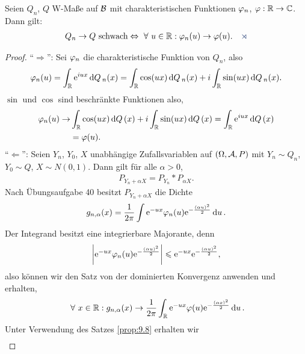 \begin{prop}
\label{prop:9.10}
Seien $Q_{n}$, $Q$ W-Maße auf ${\BB}$ mit
charakteristischen Funktionen $\ph_{n}$, $\ph :\R\to \C$.
Dann gilt:
\begin{align*}
Q_{n}\to Q \text{ schwach} \Leftrightarrow \forall u\in
\R : \ph_{n} (u) \to \ph (u).\fishhere
\end{align*}
\end{prop}
\begin{proof}
``$\Rightarrow$'': Sei $\ph_n$ die charakteristische Funktion von $Q_n$, also
\begin{align*}
\ph_n(u) = \int_\R \e^{iux}\dQ_n(x)
= \int_\R \cos(ux)\dQ_n(x) + i\int_\R \sin(ux)\dQ_n(x).
\end{align*}
$\sin$ und $\cos$ sind beschränkte Funktionen also,
\begin{align*}
\ph_n(u)
\to &\int_\R \cos(ux)\dQ(x) + i\int_\R \sin(ux)\dQ(x)
= \int_\R \e^{iux}\dQ(x) \\ &= \ph(u).
\end{align*}
``$\Leftarrow$'': Seien $Y_n$, $Y_0$, $X$ unabhängige Zufallsvariablen auf
$(\Omega,\AA,P)$ mit $Y_n\sim Q_n$, $Y_0\sim Q$, $X\sim N(0,1)$. Dann gilt für
alle $\alpha>0$,
\begin{align*}
P_{Y_n+\alpha X} = P_{Y_n}*P_{\alpha X}.
\end{align*}
Nach Übungsaufgabe 40 besitzt $P_{Y_n+\alpha X}$ die Dichte
\begin{align*}
g_{n,\alpha}(x) = \frac{1}{2\pi}\int \e^{-ux}\ph_n(u)\e^{-\frac{(\alpha
u)^2}{2}}\du.
\end{align*}
Der Integrand besitzt eine integrierbare Majorante, denn
\begin{align*}
\abs{\e^{-ux}\ph_n(u)\e^{-\frac{(\alpha
u)^2}{2}}}
\le
\e^{-ux}\e^{-\frac{(\alpha u)^2}{2}},
\end{align*}
also können wir den Satz von der dominierten Konvergenz anwenden und erhalten,
\begin{align*}
\forall x\in\R : 
g_{n,\alpha}(x) \to \frac{1}{2\pi}\int_\R \e^{-ux}\ph(u)\e^{-\frac{(\alpha
x)^2}{2}}\du.
\end{align*}
Unter Verwendung des Satzes \ref{prop:9.8} erhalten wir
\begin{align*}

\end{align*}
\end{proof}
